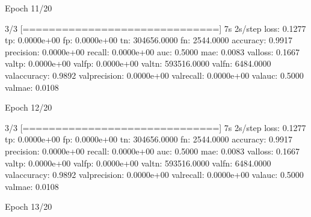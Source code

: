 \documentclass[letterpaper,10pt,english]{sphinxmanual}
\begin{document}
\begin{sphinxVerbatim}[commandchars=\\\{\}]
Epoch 11/20
\end{sphinxVerbatim}

\begin{sphinxVerbatim}[commandchars=\\\{\}]
3/3 [==============================] \PYGZhy{} 7s 2s/step \PYGZhy{} loss: 0.1277 \PYGZhy{} tp: 0.0000e+00 \PYGZhy{} fp: 0.0000e+00 \PYGZhy{} tn: 304656.0000 \PYGZhy{} fn: 2544.0000 \PYGZhy{} accuracy: 0.9917 \PYGZhy{} precision: 0.0000e+00 \PYGZhy{} recall: 0.0000e+00 \PYGZhy{} auc: 0.5000 \PYGZhy{} mae: 0.0083 \PYGZhy{} val\PYGZus{}loss: 0.1667 \PYGZhy{} val\PYGZus{}tp: 0.0000e+00 \PYGZhy{} val\PYGZus{}fp: 0.0000e+00 \PYGZhy{} val\PYGZus{}tn: 593516.0000 \PYGZhy{} val\PYGZus{}fn: 6484.0000 \PYGZhy{} val\PYGZus{}accuracy: 0.9892 \PYGZhy{} val\PYGZus{}precision: 0.0000e+00 \PYGZhy{} val\PYGZus{}recall: 0.0000e+00 \PYGZhy{} val\PYGZus{}auc: 0.5000 \PYGZhy{} val\PYGZus{}mae: 0.0108
\end{sphinxVerbatim}

\begin{sphinxVerbatim}[commandchars=\\\{\}]
Epoch 12/20
\end{sphinxVerbatim}

\begin{sphinxVerbatim}[commandchars=\\\{\}]
3/3 [==============================] \PYGZhy{} 7s 2s/step \PYGZhy{} loss: 0.1277 \PYGZhy{} tp: 0.0000e+00 \PYGZhy{} fp: 0.0000e+00 \PYGZhy{} tn: 304656.0000 \PYGZhy{} fn: 2544.0000 \PYGZhy{} accuracy: 0.9917 \PYGZhy{} precision: 0.0000e+00 \PYGZhy{} recall: 0.0000e+00 \PYGZhy{} auc: 0.5000 \PYGZhy{} mae: 0.0083 \PYGZhy{} val\PYGZus{}loss: 0.1667 \PYGZhy{} val\PYGZus{}tp: 0.0000e+00 \PYGZhy{} val\PYGZus{}fp: 0.0000e+00 \PYGZhy{} val\PYGZus{}tn: 593516.0000 \PYGZhy{} val\PYGZus{}fn: 6484.0000 \PYGZhy{} val\PYGZus{}accuracy: 0.9892 \PYGZhy{} val\PYGZus{}precision: 0.0000e+00 \PYGZhy{} val\PYGZus{}recall: 0.0000e+00 \PYGZhy{} val\PYGZus{}auc: 0.5000 \PYGZhy{} val\PYGZus{}mae: 0.0108
\end{sphinxVerbatim}

\begin{sphinxVerbatim}[commandchars=\\\{\}]
Epoch 13/20
\end{sphinxVerbatim}
\end{document}

